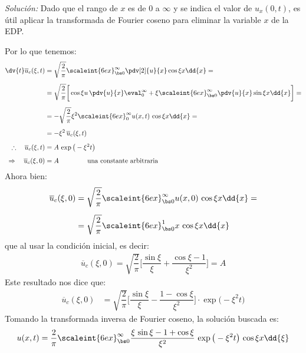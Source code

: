 \textit{Solución:} Dado que el rango de $x$ es de $0$ a $\infty$ y se indica el valor de $u_{x} (0, t)$, es útil aplicar la transformada de Fourier coseno para eliminar la variable $x$ de la EDP.
\par
Por lo que tenemos:
\begin{align*}
\dv{t} \overline{u}_{c} (\xi, t) &= \sqrt{\dfrac{2}{\pi}} \scaleint{6ex}_{\bs 0}^{\infty} \pdv[2]{u}{x} \cos \xi x \dd{x} = \\[0.5em]
&= \sqrt{\dfrac{2}{\pi}} \bigg[ \cos \xi u \, \pdv{u}{x} \eval_{0}^{\infty} + \xi \scaleint{6ex}_{\bs 0}^{\infty} \pdv{u}{x} \sin \xi x \dd{x} \bigg] = \\[0.5em]
&= - \sqrt{\dfrac{2}{\pi}} \xi^{2} \scaleint{6ex}_{0}^{\infty} u (x, t) \, \cos \xi x \dd{x} = \\[0.5em]
&= - \xi^{2} \, \overline{u}_{c} (\xi, t) \\[0.5em]
\therefore \quad \overline{u}_{c} (\xi, t) &= A \, \exp\big( - \xi^{2} t \big) \\[0.5em]
\Rightarrow \quad \overline{u}_{c} (\xi, 0) &= A \hspace{1.5cm} \mbox{una constante arbitraria}
\end{align*}
Ahora bien:
\begin{align*}
\overline{u}_{c} (\xi, 0) &= \sqrt{\dfrac{2}{\pi}} \scaleint{6ex}_{\bs 0}^{\infty} u(x, 0) \, \cos \xi x \dd{x} = \\[0.5em]
&= \sqrt{\dfrac{2}{\pi}} \scaleint{6ex}_{\bs 0}^{1} x \, \cos \xi x \dd{x}
\end{align*}
que al usar la condición inicial, es decir:
\begin{align*}
\overline{u}_{c} (\xi, 0) = \sqrt{\dfrac{2}{\pi}} \bigg[ \dfrac{\sin \xi}{\xi} + \dfrac{\cos \xi - 1}{\xi^{2}} \bigg] = A
\end{align*}
Este resultado nos dice que:
\begin{align*}
\overline{u}_{c} (\xi, 0) &= \sqrt{\dfrac{2}{\pi}} \bigg[ \dfrac{\sin \xi}{\xi} - \dfrac{1 - \cos \xi}{\xi^{2}} \bigg] \cdot \exp\big( -\xi^{2} t \big)
\end{align*}
Tomando la transformada inversa de Fourier coseno, la solución buscada es:
\begin{align*}
u(x, t) = \dfrac{2}{\pi} \scaleint{6ex}_{\bs 0}^{\infty} \dfrac{\xi \, \sin \xi - 1 + \cos \xi}{\xi^{2}} \, \exp \big( - \xi^{2} t \big) \, \cos \xi x \dd{\xi}
\end{align*}
